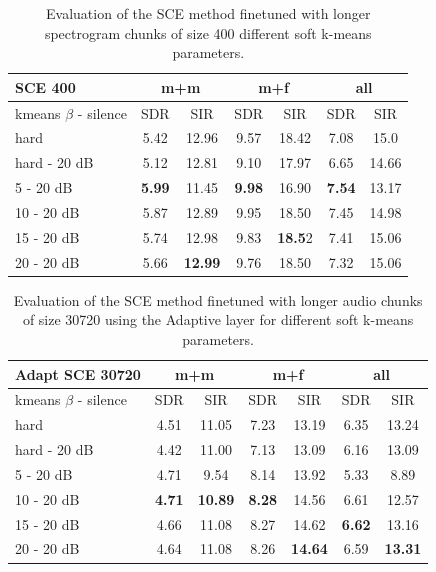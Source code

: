 \documentclass[master, tikz, final,11pt, dvipdfmx]{iscs-thesis}
\begin{document}
\begin{table}[h!]
\centering
\begin{tabular}{l|c|c|c|c|c|c}
SCE 400 & \multicolumn{2}{c|}{m+m} & \multicolumn{2}{c|}{m+f} & \multicolumn{2}{c}{all} \\ 
\hline 
kmeans $\beta$ - silence & SDR & SIR & SDR & SIR & SDR & SIR \\ 
\hline
hard  & 5.42 & 12.96 & 9.57 & 18.42 & 7.08 & 15.0 \\ 
hard - 20 dB  & 5.12 & 12.81 & 9.10 & 17.97 & 6.65 & 14.66 \\
\hline
\hline
5 - 20 dB  & \cellcolor{green}\textbf{5.99} & \cellcolor{green}11.45 & \cellcolor{green}\textbf{9.98} & \cellcolor{green}16.90 & \cellcolor{green}\textbf{7.54} & \cellcolor{green}13.17 \\ 
10 - 20 dB  & 5.87 & 12.89 & 9.95 & 18.50 & 7.45 & 14.98 \\ 
15 - 20 dB & 5.74 & 12.98 & 9.83 & \textbf{18.5}2 & 7.41 & 15.06 \\ 
20 - 20 dB & 5.66 & \textbf{12.99} & 9.76 & 18.50 & 7.32 & 15.06 \\ 
\end{tabular}
\caption[Evaluation of the SCE method finetuned with longer spectrogram chunks of size 400]{Evaluation of the SCE method finetuned with longer spectrogram chunks of size 400 different soft k-means parameters.}
\label{table:SCE400}
\end{table}

\begin{table}[h!]
\centering
\begin{tabular}{l|c|c|c|c|c|c}
Adapt SCE 30720 & \multicolumn{2}{c|}{m+m} & \multicolumn{2}{c|}{m+f} & \multicolumn{2}{c}{all} \\ 
\hline 
kmeans $\beta$ - silence & SDR & SIR & SDR & SIR & SDR & SIR \\ 
\hline
hard & 4.51 & 11.05 & 7.23 & 13.19 & 6.35 & 13.24 \\ 
hard - 20 dB  & 4.42 & 11.00 & 7.13 & 13.09 & 6.16 & 13.09 \\
\hline
\hline
5 - 20 dB  & 4.71 & 9.54 & 8.14 & 13.92 & 5.33 & 8.89 \\ 
10 - 20 dB  & \cellcolor{green}\textbf{4.71} & \cellcolor{green}\textbf{10.89} & \cellcolor{green}\textbf{8.28} & \cellcolor{green}14.56 & 6.61 & 12.57 \\ 
15 - 20 dB & 4.66 & 11.08 & 8.27 & 14.62 & \cellcolor{green}\textbf{6.62} & \cellcolor{green}13.16 \\ 
20 - 20 dB & 4.64 & 11.08 & 8.26 & \textbf{14.64} & 6.59 & \textbf{13.31} \\ 
\end{tabular}
\caption[Evaluation of the SCE method finetuned with longer audio chunks of size 30720 using the Adaptive layer]{Evaluation of the SCE method finetuned with longer audio chunks of size 30720 using the Adaptive layer for different soft k-means parameters.}
\label{table:AdaptSCEext}
\end{table}
\end{document}
